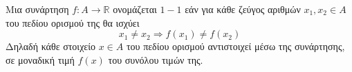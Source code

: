 Μια συνάρτηση $ f:A\rightarrow\mathbb{R} $ ονομάζεται $ 1-1 $ εάν για κάθε ζεύγος αριθμών $ x_1,x_2\in A $ του πεδίου ορισμού της θα ισχύει \[ x_1\neq x_2\Rightarrow f(x_1)\neq f(x_2) \]
Δηλαδή κάθε στοιχείο $ x\in A $ του πεδίου ορισμού αντιστοιχεί μέσω της συνάρτησης, σε μοναδική τιμή $ f(x) $ του συνόλου τιμών της.
